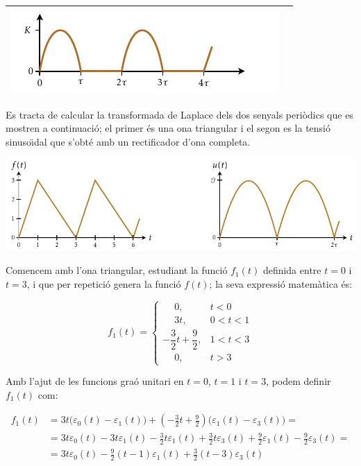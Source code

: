 \begin{longtable}{cc}
   \includegraphics{Imatges/Cap-Laplace-Funcio-15.pdf} & \raisebox{0.8cm}{$K\dfrac{\dfrac{\piup}{\tau}}{s^2+\dfrac{\piup^2}{\tau^2}}\dfrac{1}{(1-\eu^{-\tau s})}$}\\[2.4ex]
    \bottomrule[1pt]
\end{longtable}

\begin{exemple}
    Es tracta de calcular la transformada de Laplace dels dos
    senyals peri\`{o}dics que es mostren a continuaci\'{o}; el primer \'{e}s una
    ona triangular i el segon es la tensi\'{o} sinuso\"{\i}dal que s'obt\'{e} amb un
    rectificador d'ona completa.

    \begin{center}
        \includegraphics{Imatges/Cap-Laplace-Exemple1.pdf}
    \end{center}

    Comencem amb l'ona triangular, estudiant la funci\'{o} $f_1(t)$ definida
    entre $t=0$ i $t=3$, i que per repetici\'{o} genera la funci\'{o} $f(t)$; la
    seva expressi\'{o} matem\`{a}tica \'{e}s:

    \[
        f_1(t) = \begin{cases}
        \phantom{-}0, & t < 0\\
        \phantom{-}3t, & 0<t<1 \\
        -\dfrac{3}{2}t +\dfrac{9}{2}, & 1 < t < 3 \\
        \phantom{-}0, & t > 3 \end{cases}
    \]

    Amb l'ajut de les funcions gra\'{o} unitari en $t=0$, $t=1$ i $t=3$,
    podem definir $f_1(t)$ com:

    \[\begin{split}
        f_1(t) &= 3t \bigl(\varepsilon_0(t) - \varepsilon_1(t)\bigr) + \left(-\frac{3}{2}t
        +\frac{9}{2}\right) \bigl(\varepsilon_1(t) -
        \varepsilon_3(t)\bigr) = \\
        &=
        3t\varepsilon_0(t)-3t\varepsilon_1(t)-\frac{3}{2}t \varepsilon_1(t)
        +\frac{3}{2}t \varepsilon_3(t) +\frac{9}{2} \varepsilon_1(t)
        -\frac{9}{2} \varepsilon_3(t) = \\
        &=3t\varepsilon_0(t) -\frac{9}{2}(t-1)\varepsilon_1(t) +
        \frac{3}{2}(t-3)\varepsilon_3(t)
    \end{split}\]


\end{exemple}
